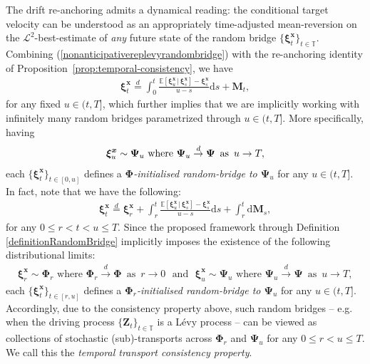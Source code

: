 \documentclass{article}
\newcommand{\levy}{{L\'evy }}
\def\E{\mathbb{E}}
\def\T{\mathbb{T}}
\def\dd{\mathrm{d}}
\def\xib{\boldsymbol{\xi}}
\theoremstyle{definition}
\begin{document}
The drift re-anchoring admits a dynamical reading: the conditional target velocity can be understood as an appropriately time-adjusted mean-reversion on the $\mathcal{L}^2$-best-estimate of \emph{any} future state of the random bridge $\{\boldsymbol{\xi}^{\boldsymbol{x}}_t\}_{t \in \mathbb{T}}$. Combining (\ref{nonanticipativereplevyrandombridge}) with the re-anchoring identity of Proposition~\ref{prop:temporal-consistency}, we have
\begin{align}
\label{nonanticipativerewritten}
\xib^{\boldsymbol{x}}_t \overset{d}{=} \int_0^t \frac{  \E\left[ \boldsymbol{\xi}^{\boldsymbol{x}}_u \, | \, \xib^{\boldsymbol{x}}_s \right]  - \xib^{\boldsymbol{x}}_s }{u-s}\dd s + \mathbf{M}_t,
\end{align}
for any fixed $u\in(t,T]$, which further implies that we are implicitly working with infinitely many random bridges parametrized through $u\in(t,T]$. More specifically, having
\begin{align}
\boldsymbol{\xi}^{\boldsymbol{x}}_u \sim \boldsymbol{\Psi}_u \,\, \text{where} \,\, \boldsymbol{\Psi}_u \overset{d}{\rightarrow} \boldsymbol{\Psi} \,\,\, \text{as} \,\,\, u \rightarrow T, \notag
\end{align}
each $\{\boldsymbol{\xi}^{\boldsymbol{x}}_t\}_{t \in [0,u]}$ defines a \emph{$\boldsymbol{\Phi}$-initialised random-bridge to $\boldsymbol{\Psi}_u$} for any $u\in(t,T]$. In fact, note that we have the following:
\begin{align}
\xib^{\boldsymbol{x}}_t \overset{d}{=} \xib^{\boldsymbol{x}}_r + \int_r^t \frac{  \E\left[ \boldsymbol{\xi}^{\boldsymbol{x}}_u \, | \, \xib^{\boldsymbol{x}}_s \right]  - \xib^{\boldsymbol{x}}_s }{u-s}\dd s + \int_r^t \dd \mathbf{M}_s, \label{twowayconstruct}
\end{align}
for any $0\leq r < t < u \leq T$. Since the proposed framework through Definition \ref{definitionRandomBridge} implicitly imposes the existence of the following distributional limits:
\begin{align}
\boldsymbol{\xi}^{\boldsymbol{x}}_r \sim \boldsymbol{\Phi}_r \,\, \text{where} \,\, \boldsymbol{\Phi}_r \overset{d}{\rightarrow} \boldsymbol{\Phi} \,\,\, \text{as} \,\,\, r \rightarrow 0 \,\,\,\, \text{and} \,\,\,\,
\boldsymbol{\xi}^{\boldsymbol{x}}_u \sim \boldsymbol{\Psi}_u \,\, \text{where} \,\, \boldsymbol{\Psi}_u \overset{d}{\rightarrow} \boldsymbol{\Psi} \,\,\, \text{as} \,\,\, u \rightarrow T, \label{twodistributionsubtransports}
\end{align}
each $\{\boldsymbol{\xi}^{\boldsymbol{x}}_t\}_{t \in [r,u]}$ defines a \emph{$\boldsymbol{\Phi}_r$-initialised random-bridge to $\boldsymbol{\Psi}_u$} for any $u\in(t,T]$. Accordingly, due to the consistency property above, such random bridges -- e.g. when the driving process $\{\boldsymbol{Z}_{t}\}_{t\in\T}$ is a \levy process -- can be viewed as collections of stochastic (sub)-transports across $\boldsymbol{\Phi}_r$ and $\boldsymbol{\Psi}_u$ for any $0\leq r < u \leq T$. We call this the \emph{temporal transport consistency property}.
\end{document}
